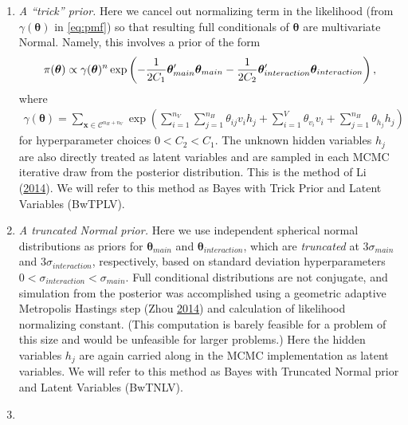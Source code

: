 \documentclass[]{article}
\providecommand{\tightlist}{%
  \setlength{\itemsep}{0pt}\setlength{\parskip}{0pt}}
\theoremstyle{definition}
\newcommand{\nv}{{n_{\scriptscriptstyle V}}}
\newcommand{\nh}{{n_{\scriptscriptstyle H}}}
\begin{document}
\begin{enumerate}
\def\labelenumi{\arabic{enumi}.}
\tightlist
\item
  \emph{A ``trick'' prior.} Here we cancel out normalizing term in the
  likelihood (from \(\gamma(\boldsymbol \theta)\) in \eqref{eq:pmf}) so
  that resulting full conditionals of \(\boldsymbol \theta\) are
  multivariate Normal. Namely, this involves a prior of the form
  \begin{align*}
   \pi(\boldsymbol \theta) \propto \gamma(\boldsymbol \theta)^n \exp\left(-\frac{1}{2C_{1}}\boldsymbol \theta_{main}'\boldsymbol \theta_{main} -\frac{1}{2C_{2}}\boldsymbol \theta_{interaction}'\boldsymbol \theta_{interaction}\right), \vspace{-.75cm}
   \end{align*} where \begin{align*}
   \gamma(\boldsymbol \theta) = \sum\limits_{\boldsymbol x \in \mathcal{C}^{\nh + \nv}}\exp\left(\sum\limits_{i = 1}^\nv\sum\limits_{j=1}^\nh \theta_{ij} v_i h_j + \sum\limits_{i = 1}^V\theta_{v_i} v_i + \sum\limits_{j = 1}^\nh\theta_{h_j} h_j\right) 
   \end{align*} for hyperparameter choices \(0< C_2 < C_1\). The unknown
  hidden variables \(h_j\) are also directly treated as latent variables
  and are sampled in each MCMC iterative draw from the posterior
  distribution. This is the method of Li
  (\protect\hyperlink{ref-li2014biclustering}{2014}). We will refer to
  this method as Bayes with Trick Prior and Latent Variables (BwTPLV).
\item
  \emph{A truncated Normal prior.} Here we use independent spherical
  normal distributions as priors for \(\boldsymbol \theta_{main}\) and
  \(\boldsymbol \theta_{interaction}\), which are \emph{truncated} at
  \(3\sigma_{main}\) and \(3\sigma_{interaction}\), respectively, based
  on standard deviation hyperparameters
  \(0<\sigma_{interaction}<\sigma_{main}\). Full conditional
  distributions are not conjugate, and simulation from the posterior was
  accomplished using a geometric adaptive Metropolis Hastings step (Zhou
  \protect\hyperlink{ref-zhou2014some}{2014}) and calculation of
  likelihood normalizing constant. (This computation is barely feasible
  for a problem of this size and would be unfeasible for larger
  problems.) Here the hidden variables \(h_j\) are again carried along
  in the MCMC implementation as latent variables. We will refer to this
  method as Bayes with Truncated Normal prior and Latent Variables
  (BwTNLV).
\item

\end{enumerate}
\end{document}
